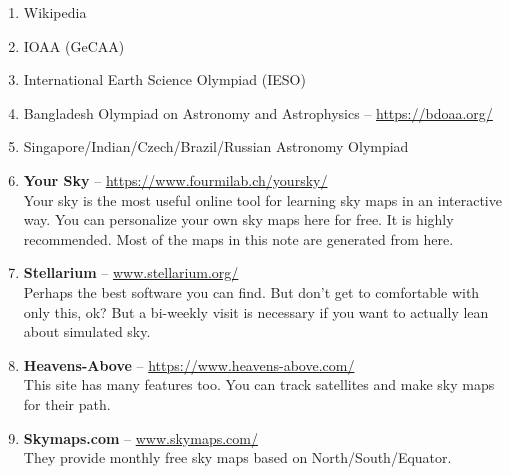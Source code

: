 \documentclass[a4paper,12pt]{extarticle}
\begin{document}
\begin{enumerate}
    \item Wikipedia
    \item  IOAA (GeCAA)
    \item International Earth Science Olympiad (IESO)
    \item Bangladesh Olympiad on Astronomy and Astrophysics -- \url{https://bdoaa.org/}
    \item Singapore/Indian/Czech/Brazil/Russian Astronomy Olympiad 
    \item \textbf{Your Sky} -- \url{https://www.fourmilab.ch/yoursky/}\\
Your sky is the most useful online tool for learning sky maps in an interactive way. You can personalize your own sky maps here for free. It is highly recommended. Most of the maps in this note are generated from here.
\item \textbf{Stellarium} -- \url{www.stellarium.org/}\\
Perhaps the best software you can find. But don’t get to comfortable with only this, ok? But a bi-weekly visit is necessary if you want to actually lean about simulated sky.
\item \textbf{Heavens-Above} -- \url{https://www.heavens-above.com/}\\
This site has many features too. You can track satellites and make sky maps for their path.
\item \textbf{Skymaps.com} -- \url{www.skymaps.com/}\\
They provide monthly free sky maps based on North/South/Equator.
\end{enumerate}
\end{document}
